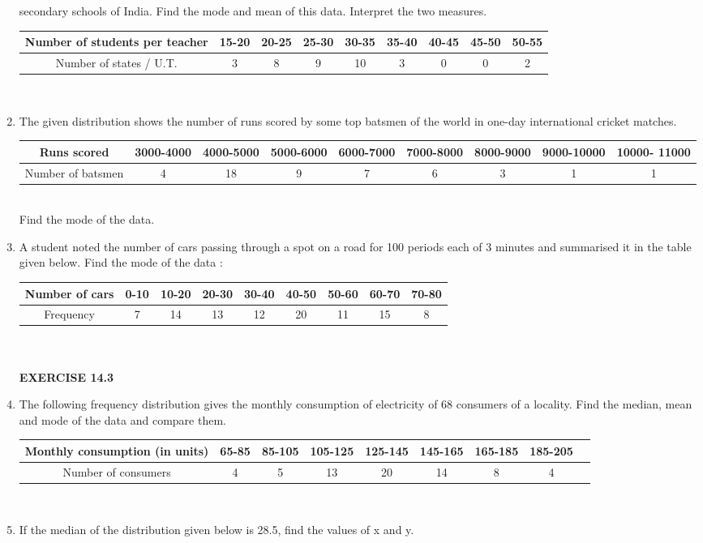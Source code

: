 \begin{enumerate}[label=\arabic*.,ref=\thesubsection.\theenumi]
secondary schools of India. Find the mode and mean of this data. Interpret the two
measures.
\begin{tabular}{|c|c|c|c|c|c|c|c|c|}
\hline
Number of students per teacher&15-20&20-25&25-30&30-35&35-40&40-45&45-50&50-55\\
\hline
Number of states / U.T.&3&8&9&10&3&0&0&2\\
\hline
\end{tabular}\\
\item The given distribution shows the number of runs scored by some top batsmen of the
world in one-day international cricket matches.
\begin{tabular}{|c|c|c|c|c|c|c|c|c|}
\hline
Runs scored&3000-4000&4000-5000&5000-6000&6000-7000&7000-8000&8000-9000&9000-10000&10000- 11000\\
\hline
Number of batsmen&4&18&9&7&6&3&1&1\\
\hline
\end{tabular}\\
Find the mode of the data.
\item A student noted the number of cars passing through a spot on a road for 100
periods each of 3 minutes and summarised it in the table given below. Find the mode
of the data :
\begin{tabular}{|c|c|c|c|c|c|c|c|c|}
\hline
Number of cars&0-10&10-20&20-30&30-40&40-50&50-60&60-70&70-80\\
\hline
Frequency&7&14&13&12&20&11&15&8\\
\hline
\end{tabular}\\\\
{\Large \textbf{EXERCISE 14.3}}
\item The following frequency distribution gives the monthly consumption of electricity of
68 consumers of a locality. Find the median, mean and mode of the data and compare
them.
\begin{tabular}{|c|c|c|c|c|c|c|c|c|}
\hline
Monthly consumption (in units)&65-85&85-105&105-125&125-145&145-165&165-185&185-205\\
\hline
Number of consumers&4&5&13&20&14&8&4\\
\hline
\end{tabular}\\
\item If the median of the distribution given below is 28.5, find the values of x and y.
\begin{tabular}{|c|c|c|c|c|c|c|c|c|}
\hline

\end{tabular}
\end{enumerate}
